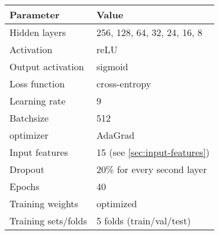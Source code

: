 

\begin{tabular}{l l}
    \toprule
    Parameter & Value \\
    \midrule
    Hidden layers & 256, 128, 64, 32, 24, 16, 8 \\
    Activation & reLU \\ 
    Output activation & sigmoid \\ 
    Loss function & cross-entropy \\ 
    Learning rate & 9 \\
    Batchsize & 512 \\ 
    optimizer & AdaGrad \\
    Input features & 15 (see \cref{sec:input-features}) \\
    Dropout &  20\% for every second layer \\ 
    Epochs & 40 \\
    Training weights & optimized \\ 
    Training sets/folds & 5 folds (train/val/test) \\
    \bottomrule
\end{tabular}
